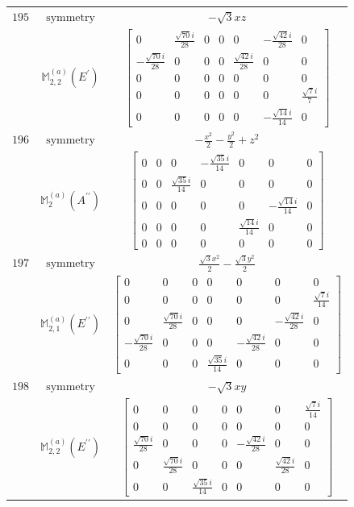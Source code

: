 \documentclass[fleqn,8pt,landscape]{jsarticle}
\begin{document}
\begin{longtable}{ccc}
$ 195 $ & $ \text{symmetry} $ & $ - \sqrt{3} x z $ \\
$  $ & $ \mathbb{M}_{2,2}^{(a)}(E^{\prime}) $ & $ \begin{bmatrix} 0 & \frac{\sqrt{70} i}{28} & 0 & 0 & 0 & - \frac{\sqrt{42} i}{28} & 0 \\ - \frac{\sqrt{70} i}{28} & 0 & 0 & 0 & \frac{\sqrt{42} i}{28} & 0 & 0 \\ 0 & 0 & 0 & 0 & 0 & 0 & 0 \\ 0 & 0 & 0 & 0 & 0 & 0 & \frac{\sqrt{7} i}{7} \\ 0 & 0 & 0 & 0 & 0 & - \frac{\sqrt{14} i}{14} & 0 \end{bmatrix} $ \\ \hline
$ 196 $ & $ \text{symmetry} $ & $ - \frac{x^{2}}{2} - \frac{y^{2}}{2} + z^{2} $ \\
$  $ & $ \mathbb{M}_{2}^{(a)}(A^{\prime\prime}) $ & $ \begin{bmatrix} 0 & 0 & 0 & - \frac{\sqrt{35} i}{14} & 0 & 0 & 0 \\ 0 & 0 & \frac{\sqrt{35} i}{14} & 0 & 0 & 0 & 0 \\ 0 & 0 & 0 & 0 & 0 & - \frac{\sqrt{14} i}{14} & 0 \\ 0 & 0 & 0 & 0 & \frac{\sqrt{14} i}{14} & 0 & 0 \\ 0 & 0 & 0 & 0 & 0 & 0 & 0 \end{bmatrix} $ \\ \hline
$ 197 $ & $ \text{symmetry} $ & $ \frac{\sqrt{3} x^{2}}{2} - \frac{\sqrt{3} y^{2}}{2} $ \\
$  $ & $ \mathbb{M}_{2,1}^{(a)}(E^{\prime\prime}) $ & $ \begin{bmatrix} 0 & 0 & 0 & 0 & 0 & 0 & 0 \\ 0 & 0 & 0 & 0 & 0 & 0 & \frac{\sqrt{7} i}{14} \\ 0 & \frac{\sqrt{70} i}{28} & 0 & 0 & 0 & - \frac{\sqrt{42} i}{28} & 0 \\ - \frac{\sqrt{70} i}{28} & 0 & 0 & 0 & - \frac{\sqrt{42} i}{28} & 0 & 0 \\ 0 & 0 & 0 & \frac{\sqrt{35} i}{14} & 0 & 0 & 0 \end{bmatrix} $ \\ \hline
$ 198 $ & $ \text{symmetry} $ & $ - \sqrt{3} x y $ \\
$  $ & $ \mathbb{M}_{2,2}^{(a)}(E^{\prime\prime}) $ & $ \begin{bmatrix} 0 & 0 & 0 & 0 & 0 & 0 & \frac{\sqrt{7} i}{14} \\ 0 & 0 & 0 & 0 & 0 & 0 & 0 \\ \frac{\sqrt{70} i}{28} & 0 & 0 & 0 & - \frac{\sqrt{42} i}{28} & 0 & 0 \\ 0 & \frac{\sqrt{70} i}{28} & 0 & 0 & 0 & \frac{\sqrt{42} i}{28} & 0 \\ 0 & 0 & \frac{\sqrt{35} i}{14} & 0 & 0 & 0 & 0 \end{bmatrix} $ \\ \hline

\end{longtable}
\end{document}
